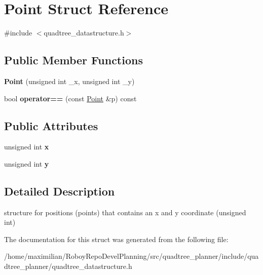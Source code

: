 \hypertarget{structPoint}{}\section{Point Struct Reference}
\label{structPoint}


{\ttfamily \#include $<$quadtree\+\_\+datastructure.\+h$>$}

\subsection*{Public Member Functions}
\begin{DoxyCompactItemize}
\item 
\mbox{\label{structPoint_a5e6f571a8e78582930ceda907f4117cd}} 
{\bfseries Point} (unsigned int \+\_\+x, unsigned int \+\_\+y)
\item 
\mbox{\label{structPoint_a3618cc973762afde2e8df59bff4a86ca}} 
bool {\bfseries operator==} (const \hyperlink{structPoint}{Point} \&p) const
\end{DoxyCompactItemize}
\subsection*{Public Attributes}
\begin{DoxyCompactItemize}
\item 
\mbox{\label{structPoint_a81bb3d87085a9672879cfe4e58f7bff3}} 
unsigned int {\bfseries x}
\item 
\mbox{\label{structPoint_aafc3278398083cef91e29bf68c7d6c87}} 
unsigned int {\bfseries y}
\end{DoxyCompactItemize}


\subsection{Detailed Description}
structure for positions (points) that contains an x and y coordinate (unsigned int) 

The documentation for this struct was generated from the following file\+:\begin{DoxyCompactItemize}
\item 
/home/maximilian/\+Roboy\+Repo\+Devel\+Planning/src/quadtree\+\_\+planner/include/quadtree\+\_\+planner/quadtree\+\_\+datastructure.\+h\end{DoxyCompactItemize}
